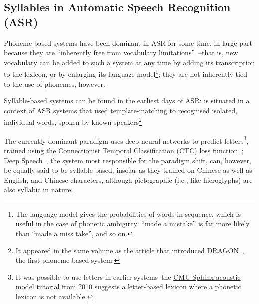 \documentclass{article}[11pt]
\begin{document}

\subsection{Syllables in Automatic Speech Recognition (ASR)}
\label{ssect:syllasr}

Phoneme-based systems have been dominant in ASR for some time, in large part because they are ``inherently free from vocabulary limitations''~\citep{lopes_phoneme_2011}--that is, new vocabulary can be added to such a system at any time by adding its transcription to the lexicon, or by enlarging its language model\footnote{The language model gives the probabilities of words in sequence, which is useful in the case of phonetic ambiguity: ``made a mistake'' is far more likely than ``made a miss take'', and so on.}; they are not inherently tied to the use of phonemes, however.

Syllable-based systems can be found in the earliest days of ASR: \citet{fujimura_syllable_1975} is situated in a context of ASR systems that used template-matching to recognised isolated, individual words, spoken by known speakers\footnote{It appeared in the same volume as the article that introduced DRAGON~\citep{baker_dragon_1975}, the first phoneme-based system.}

The currently dominant paradigm uses deep neural networks to predict letters\footnote{It was possible to use letters in earlier systems--the \href{http://web.archive.org/web/20100814172908/http://cmusphinx.sourceforge.net/wiki/tutorialam}{CMU Sphinx acoustic model tutorial} from 2010 suggests a letter-based lexicon where a phonetic lexicon is not available.}, trained using the Connectionist Temporal Classification (CTC) loss function~\citep{graves_towards_2014}; Deep Speech~\citep{hannun_deep_2014}, the system most responsible for the paradigm shift, can, however, be equally said to be syllable-based, insofar as they trained on Chinese as well as English, and Chinese characters, although pictographic (i.e., like hieroglyphs) are also syllabic in nature.
\end{document}
